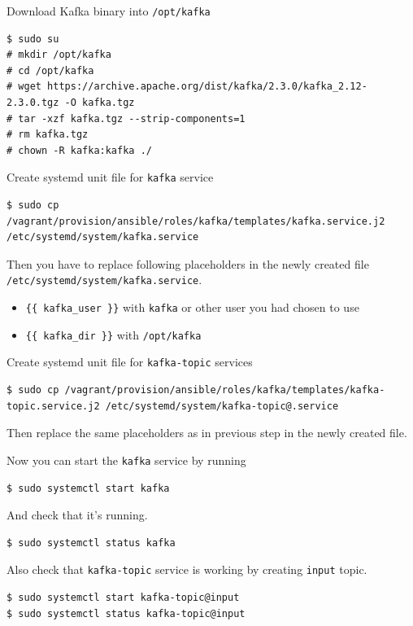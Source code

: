\documentclass[a4paper]{article} %
\begin{document}
Download Kafka binary into \texttt{/opt/kafka}
\begin{lstlisting}
$ sudo su
# mkdir /opt/kafka
# cd /opt/kafka
# wget https://archive.apache.org/dist/kafka/2.3.0/kafka_2.12-2.3.0.tgz -O kafka.tgz
# tar -xzf kafka.tgz --strip-components=1
# rm kafka.tgz
# chown -R kafka:kafka ./
\end{lstlisting}

Create systemd unit file for \texttt{kafka} service
\begin{lstlisting}
$ sudo cp /vagrant/provision/ansible/roles/kafka/templates/kafka.service.j2 /etc/systemd/system/kafka.service
\end{lstlisting}

Then you have to replace following placeholders in the newly created file \texttt{/etc/systemd/system/kafka.service}.

\begin{itemize}[noitemsep,nolistsep]
\item \texttt{\{\{ kafka\_user \}\}} with \texttt{kafka} or other user you had chosen to use
\item \texttt{\{\{ kafka\_dir \}\}} with \texttt{/opt/kafka}
\end{itemize}

Create systemd unit file for \texttt{kafka-topic} services

\begin{lstlisting}
$ sudo cp /vagrant/provision/ansible/roles/kafka/templates/kafka-topic.service.j2 /etc/systemd/system/kafka-topic@.service
\end{lstlisting}

Then replace the same placeholders as in previous step in the newly created file.

Now you can start the \texttt{kafka} service by running

\begin{lstlisting}
$ sudo systemctl start kafka
\end{lstlisting}

And check that it's running.

\begin{lstlisting}
$ sudo systemctl status kafka
\end{lstlisting}

Also check that \texttt{kafka-topic} service is working by creating \texttt{input} topic.

\begin{lstlisting}
$ sudo systemctl start kafka-topic@input
$ sudo systemctl status kafka-topic@input
\end{lstlisting}
\end{document}
